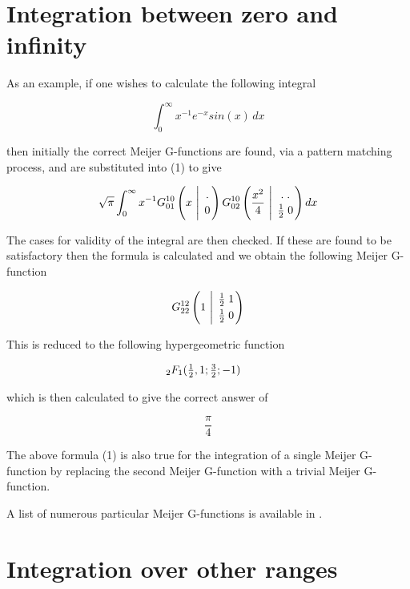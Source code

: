 \section{Integration between zero and infinity}

As an example, if one wishes to calculate the following integral

\begin{displaymath}
\int_{0}^{\infty} x^{-1} e^{-x} sin(x) \, dx
\end{displaymath}

then initially the  correct Meijer G-functions are found, via a 
pattern matching 
process, and are substituted into (1) to give

\begin{displaymath}
\sqrt{\pi} \int_{0}^{\infty} x^{-1} G^{1 0}_{0 1} \left(x 
\ \Bigg\vert \ 
{. \atop 0}\right) G^{1 0}_{0 2}\left(\frac{x^{2}}{4} 
\ \Bigg\vert \ {. \; .  \atop \frac{1}{2} \; 0} \right) dx
\end{displaymath}

The cases for validity of the integral are then checked. If these 
are found to be satisfactory then the formula is calculated and we 
obtain the following Meijer G-function 

\begin{displaymath}  
G^{1 2}_{2 2} \left(1 \ \Bigg\vert \ {\frac{1}{2} \; 1 \atop 
\frac{1}{2} \; 0} \right)
\end{displaymath} 

This is reduced to the following hypergeometric function

\begin{math}
\hspace{50mm} _2F_1 (\frac{1}{2},1;\frac{3}{2};-1 )
\end{math}

which is then calculated to give the correct answer of 

\begin{displaymath}
\frac{\pi}{4}
\end{displaymath}

The above formula (1) is also true for the integration of a single
Meijer G-function by replacing the second Meijer G-function 
with a trivial Meijer G-function.

A list of numerous particular Meijer G-functions is available in 
\cite {Prudnikov}.

\section{Integration over other ranges}

